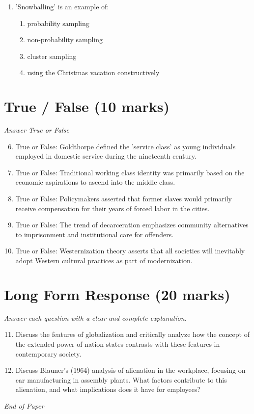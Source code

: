 \documentclass[12pt]{article}
\begin{document}
\begin{enumerate}[label=\arabic*.]
\begin{enumerate}[label=(\alph*)]
    \item a fixed geographical location
    \item collective action based on common interests
\end{enumerate}
\item 'Snowballing' is an example of:
\begin{enumerate}[label=(\alph*)]
    \item probability sampling
    \item non-probability sampling
    \item cluster sampling
    \item using the Christmas vacation constructively
\end{enumerate}
\end{enumerate}

\section*{True / False (10 marks)}
\textit{Answer True or False}
\begin{enumerate}[label=\arabic*.]
\setcounter{enumi}{5}
\item True or False: Goldthorpe defined the 'service class' as young individuals employed in domestic service during the nineteenth century.
\item True or False: Traditional working class identity was primarily based on the economic aspirations to ascend into the middle class.
\item True or False: Policymakers asserted that former slaves would primarily receive compensation for their years of forced labor in the cities.
\item True or False: The trend of decarceration emphasizes community alternatives to imprisonment and institutional care for offenders.
\item True or False: Westernization theory asserts that all societies will inevitably adopt Western cultural practices as part of modernization.
\end{enumerate}

\section*{Long Form Response (20 marks)}
\textit{Answer each question with a clear and complete explanation.}
\begin{enumerate}[label=\arabic*.]
\setcounter{enumi}{10}
\item Discuss the features of globalization and critically analyze how the concept of the extended power of nation-states contrasts with these features in contemporary society.
\item Discuss Blauner's (1964) analysis of alienation in the workplace, focusing on car manufacturing in assembly plants. What factors contribute to this alienation, and what implications does it have for employees?
\end{enumerate}

\vfill
\noindent\textit{End of Paper}
\end{document}
